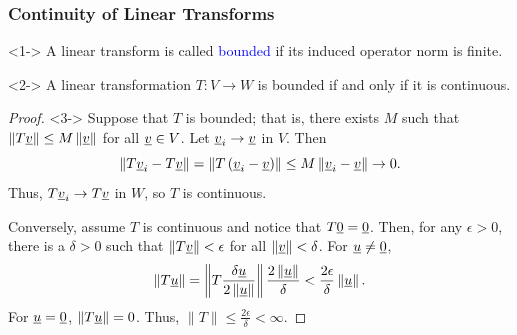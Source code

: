 \documentclass[10pt,english,aspectratio=169]{beamer}
\begin{document}
\begin{frame}[shrink=3] \frametitle{Continuity of Linear Transforms}

\vspace{-1mm}

\begin{definition}<1->
A linear transform is called \textcolor{blue}{bounded} if its induced operator norm is finite.
\end{definition}

\vspace{-1mm}

\begin{theorem}<2->
A linear transformation $T \colon V \rightarrow W$ is bounded if and only if it is continuous.
\end{theorem}

\vspace{-1mm}

\begin{proof}<3->
Suppose that $T$ is bounded; that is, there exists $M$ such that  $\left\| T \underline{v} \right\| \leq M \left\| \underline{v} \right\|$ for all $\underline{v} \in V$.
Let $\underline{v}_i \to \underline{v}$ in $V$. Then \vspace{-2mm}
\begin{equation*}
\left\| T \vecnot{v}_i - T \vecnot{v} \right\|
= \left\| T \left( \vecnot{v}_i - \vecnot{v} \right) \right\|
\leq M \left\| \vecnot{v}_i - \vecnot{v} \right\| \to 0. \vspace{-1mm}
\end{equation*}
Thus, $T\underline{v}_i \to T\underline{v}$ in $W$, so $T$ is continuous. \vspace{1mm}

Conversely, assume $T$ is continuous and notice that $T \underline{0} = \underline{0}$.
Then, for any $\epsilon > 0$, there is a $\delta>0$ such that $\| T \underline{v} \| < \epsilon$ for all $\| \underline{v} \| < \delta$.
For $\underline{u}\neq\underline{0}$, \vspace{-2mm}
\begin{equation*}
\left\| T \vecnot{u} \right\|
= \left\| T \frac{ \delta \vecnot{u} }{2 \left\| \vecnot{u} \right\| } \right\|
\frac{ 2 \left\| \vecnot{u} \right\| }{ \delta }
< \frac{2 \epsilon}{ \delta } \left\| \vecnot{u} \right\|. \vspace{-3mm}
\end{equation*}
For $\underline{u}=\underline{0}$, $\|T\underline{u}\|=0$. Thus, $\|T\|\leq \frac{2\epsilon}{\delta}<\infty$.
\vspace{-1mm}
\end{proof}

\end{frame}
\end{document}
